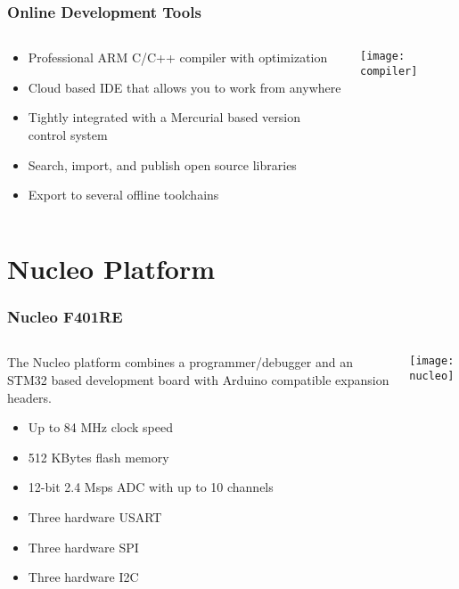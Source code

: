 \begin{frame}[t]
	\frametitle{Online Development Tools}
	\begin{columns}[T]
		\begin{column}{0.5\textwidth}
			\begin{itemize}
				\item Professional ARM C/C++ compiler with optimization
				\item Cloud based IDE that allows you to work from anywhere
				\item Tightly integrated with a Mercurial based version control system
				\item Search, import, and publish open source libraries
				\item Export to several offline toolchains
			\end{itemize}
		\end{column}
		\begin{column}{0.5\textwidth}
			\texttt{[image: compiler]}
		\end{column}
	\end{columns}
\end{frame}

\section{Nucleo Platform}
\begin{frame}
	\frametitle{Nucleo F401RE}
	\begin{columns}[T]
		\begin{column}{0.5\textwidth}
			The Nucleo platform combines a programmer/debugger and an STM32 based development board with Arduino compatible expansion headers.
			\begin{itemize}
				\item Up to 84 MHz clock speed
				\item 512 KBytes flash memory
				\item 12-bit 2.4 Msps ADC with up to 10 channels
				\item Three hardware USART
				\item Three hardware SPI
				\item Three hardware I2C
			\end{itemize}
		\end{column}
		\begin{column}{0.5\textwidth}
			\texttt{[image: nucleo]}
		\end{column}
	\end{columns}
\end{frame}